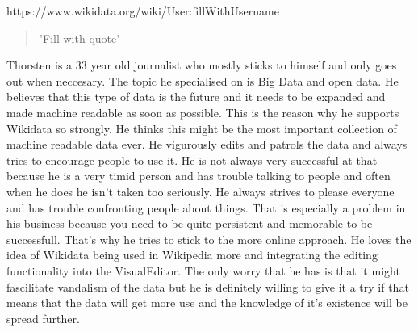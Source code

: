 \documentclass{article}
\begin{document}
\pagebreak

https://www.wikidata.org/wiki/User:fillWithUsername
\begin{quote}
"Fill with quote"
\end{quote}

Thorsten is a 33 year old journalist who mostly sticks to himself and only goes out when neccesary. The topic he specialised on is Big Data and open data. He believes that this type of data is the future and it needs to be expanded and made machine readable as soon as possible. This is the reason why he supports Wikidata so strongly. He thinks this might be the most important collection of machine readable data ever. He vigurously edits and patrols the data and always tries to encourage people to use it. He is not always very successful at that because he is a very timid person and has trouble talking to people and often when he does he isn't taken too seriously. He always strives to please everyone and has trouble confronting people about things. That is especially a problem in his business because you need to be quite persistent and memorable to be successfull. That's why he tries to stick to the more online approach. He loves the idea of Wikidata being used in Wikipedia more and integrating the editing functionality into the VisualEditor. The only worry that he has is that it might fascilitate vandalism of the data but he is definitely willing to give it a try if that means that the data will get more use and the knowledge of it's existence will be spread further.
\end{document}
